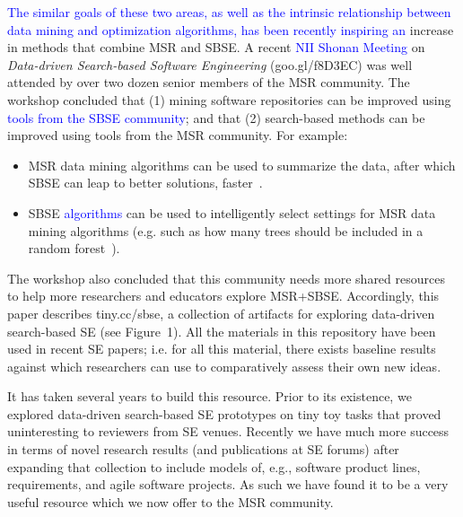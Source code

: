 \documentclass[sigconf,anonymous,review]{acmart}
\newcommand\TODO[1]{\textcolor{ScarletRed}{\textbf{\colorbox{yellow}{\small TODO:}} \emph{#1}}\xspace}
\newcommand\llm[1]{\textcolor{blue}{#1\xspace}}
\begin{document}


\llm{The similar goals of these two areas, as well as the intrinsic relationship between data mining and optimization algorithms, has been recently inspiring an} increase in methods that combine MSR and SBSE.
A recent \llm{NII Shonan Meeting}  on {\em Data-driven Search-based Software
Engineering} (goo.gl/f8D3EC)   was well attended by over two dozen senior members of the MSR community.
The workshop concluded that (1) mining software repositories can be improved using \llm{tools from the SBSE community}; and that (2) search-based methods can be improved using tools from the MSR community. 
For example:
\begin{itemize}
\item
MSR data mining algorithms can be used to summarize the data, after which SBSE can leap to better solutions, faster~\cite{krall2015gale}.
\item
SBSE \llm{algorithms} can be used to intelligently select 
settings for MSR data mining algorithms (e.g.
such as how many trees should be included in a random
forest~\cite{fu2016tuning}).
\end{itemize}
The workshop also concluded that this community needs more shared  resources 
to help more  researchers and educators   explore MSR+SBSE.
Accordingly, this paper describes  tiny.cc/sbse,
a collection of artifacts for exploring
data-driven search-based SE (see Figure~1). 
All the materials in this repository
have been   used in recent SE papers; i.e. for all this material, there exists baseline results against which researchers can use to comparatively assess their own new ideas.

It has    taken several years to build this resource. Prior to its
existence, we explored  data-driven search-based SE
prototypes on tiny toy tasks that proved 
uninteresting to 
 reviewers from SE venues. 
Recently we have much more success in terms of novel
research results
(and publications at SE forums) after 
expanding that collection
to include models
of, e.g., software product lines, requirements, and
agile software projects. 
As such we have found it to be a very useful resource
which we now offer to the MSR community.
\end{document}
